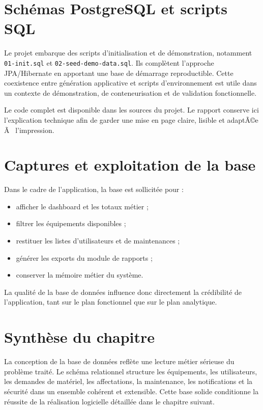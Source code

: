 ﻿\documentclass[12pt,a4paper,oneside]{report}
\newenvironment{codeblock}[1][]{
  \par
  \captionsetup{type=figure}
}{
  \par
}
\begin{document}
\section{Schémas PostgreSQL et scripts SQL}
Le projet embarque des scripts d'initialisation et de démonstration, notamment \texttt{01-init.sql} et \texttt{02-seed-demo-data.sql}. Ils complètent l'approche JPA/Hibernate en apportant une base de démarrage reproductible. Cette coexistence entre génération applicative et scripts d'environnement est utile dans un contexte de démonstration, de conteneurisation et de validation fonctionnelle.

\begin{codeblock}[H]
\caption{Script d'initialisation PostgreSQL}
\begin{keybox}
Le code complet est disponible dans les sources du projet. Le rapport conserve ici l'explication technique afin de garder une mise en page claire, lisible et adaptÃ©e Ã  l'impression.
\end{keybox}
\end{codeblock}

\section{Captures et exploitation de la base}
Dans le cadre de l'application, la base est sollicitée pour :
\begin{itemize}
  \item afficher le dashboard et les totaux métier ;
  \item filtrer les équipements disponibles ;
  \item restituer les listes d'utilisateurs et de maintenances ;
  \item générer les exports du module de rapports ;
  \item conserver la mémoire métier du système.
\end{itemize}

La qualité de la base de données influence donc directement la crédibilité de l'application, tant sur le plan fonctionnel que sur le plan analytique.

\section{Synthèse du chapitre}
La conception de la base de données reflète une lecture métier sérieuse du problème traité. Le schéma relationnel structure les équipements, les utilisateurs, les demandes de matériel, les affectations, la maintenance, les notifications et la sécurité dans un ensemble cohérent et extensible. Cette base solide conditionne la réussite de la réalisation logicielle détaillée dans le chapitre suivant.
\end{document}
